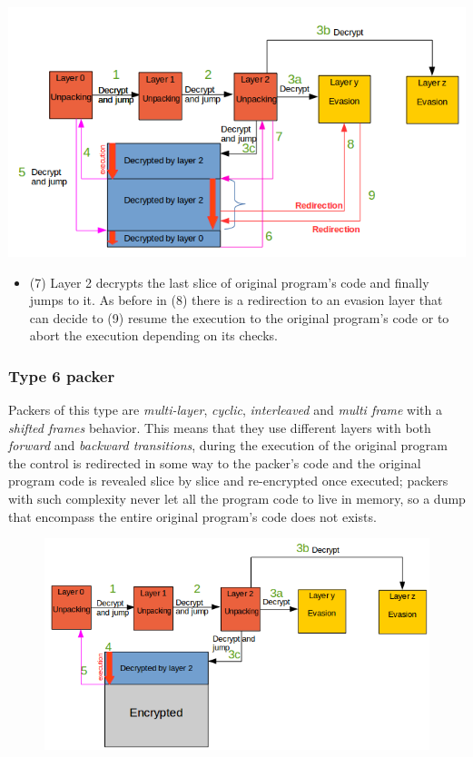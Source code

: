 \includegraphics[width=1.1\textwidth]{pictures/packer_type_5-3.png}

\begin{itemize}
\item (7) Layer 2 decrypts the last slice of original program's code and finally jumps to it. As before in (8) there is a redirection to an evasion layer that can decide to (9) resume the execution to the original program's code or to abort the execution depending on its checks.
\end{itemize}

\subsubsection{Type 6 packer}

Packers of this type are \textit{multi-layer}, \textit{cyclic}, \textit{interleaved} and \textit{multi frame} with a \textit{shifted frames} behavior. This means that they use different layers with both \textit{forward} and \textit{backward transitions}, during the execution of the original program the control is redirected in some way to the packer's code and the original program code is revealed slice by slice and re-encrypted once executed; packers with such complexity never let all the program code to live in memory, so a dump that encompass the entire original program's code does not exists.

\begin{figure}[!ht]
\begin{center}
\includegraphics[width=1\textwidth]{pictures/packer_type_5-1.png}
\end{center}
\end{figure}

